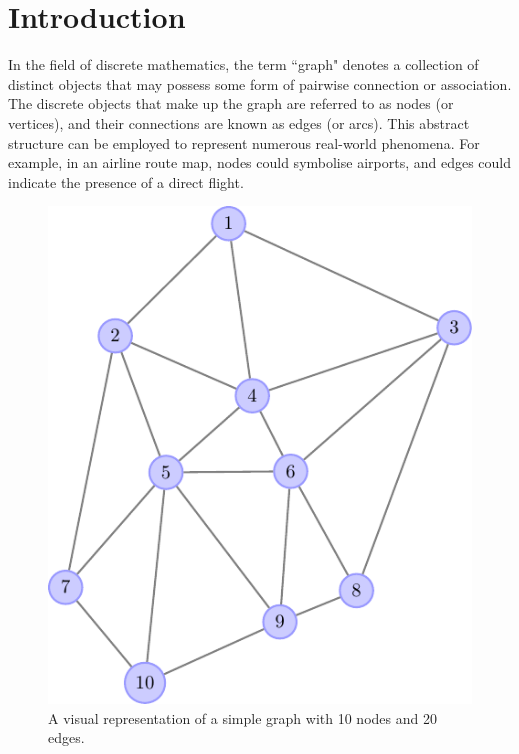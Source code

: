 


\pagestyle{fancy} 


\chapter{Introduction} 

\label{chap:ntroduction} 



In the field of discrete mathematics, the term ``graph" denotes a collection of distinct objects that may possess some form of pairwise connection or association. The discrete objects that make up the graph are referred to as nodes (or vertices), and their connections are known as edges (or arcs). This abstract structure can be employed to represent numerous real-world phenomena. For example, in an airline route map, nodes could symbolise airports, and edges could indicate the presence of a direct flight.

\vspace{0.1cm}

\begin{figure}
	\centering
		\includegraphics[width=0.9\linewidth]{Figures/graph_plot.pdf}
	\caption[A visual representation of a simple graph]{A visual representation of a simple graph with 10 nodes and 20 edges.}
	\label{fig:basic_graph}
\end{figure}


